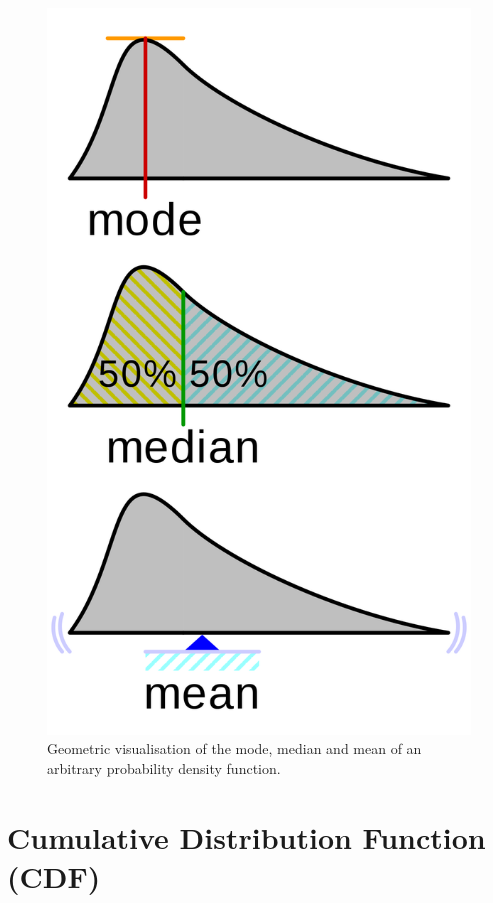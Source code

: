 \begin{figure}[h!]
\begin{center}
	\includegraphics[scale=0.07]{pdf_visual.png}
	\caption[]{Geometric visualisation of the mode, median and mean of an arbitrary probability density function.}
	\label{fairdiepmf}
	\end{center}
	\end{figure}

\section{Cumulative Distribution Function (CDF)}

